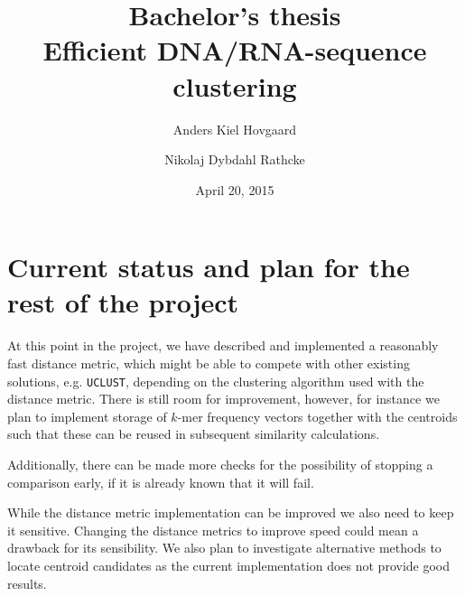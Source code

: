 \documentclass[11pt, a4paper]{article}
\title{Bachelor's thesis \\
       \vspace{2mm}
       {\LARGE Efficient DNA/RNA-sequence clustering}}
\author{Anders Kiel Hovgaard \and Nikolaj Dybdahl Rathcke}
\date{April 20, 2015}
\begin{document}
\maketitle
\thispagestyle{empty}
\newpage


\thispagestyle{plain}
\newpage

\tableofcontents
\thispagestyle{plain}
\newpage

\thispagestyle{fancy}







\section{Current status and plan for the rest of the project}

At this point in the project, we have described and implemented a reasonably
fast distance metric, which might be able to compete with other existing
solutions, e.g. \texttt{UCLUST}, depending on the clustering algorithm used
with the distance metric. There is still room for improvement, however, for
instance we plan to implement storage of $k$-mer frequency vectors together
with the centroids such that these can be reused in subsequent similarity
calculations.

Additionally, there can be made more checks for the possibility of stopping a
comparison early, if it is already known that it will fail.

While the distance metric implementation can be improved we also need to keep 
it sensitive. Changing the distance metrics to improve speed could mean a 
drawback for its sensibility. We also plan to investigate alternative methods 
to locate centroid candidates as the current implementation does not provide 
good results.


\newpage
\nocite{dong, hazelhurst, usearch, uclust}


\end{document}
